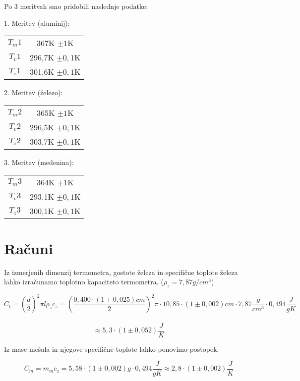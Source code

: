 \documentclass[a4paper]{article}
\begin{document}
Po 3 meritvah smo pridobili naslednje podatke:

1. Meritev (aluminij):
\begin{center}
\begin{tabular}{ |c|c| } 
 \hline
 $T_m1$ & 367K  $\pm{1}$K \\ 
 $T_v1$ & 296,7K $\pm{0,1}$K\\ 
 $T_z1$ & 301,6K $\pm{0,1}$K \\ 
 \hline
\end{tabular}
\end{center}

2. Meritev (železo):
\begin{center}
\begin{tabular}{ |c|c| } 
 \hline
 $T_m2$ & 365K  $\pm{1}$K \\ 
 $T_v2$ & 296,5K $\pm{0,1}$K\\ 
 $T_z2$ & 303,7K $\pm{0,1}$K \\ 
 \hline
\end{tabular}
\end{center}

3. Meritev (medenina):
\begin{center}
\begin{tabular}{ |c|c| } 
 \hline
 $T_m3$ & 364K  $\pm{1}$K \\ 
 $T_v3$ & 293.1K $\pm{0,1}$K\\ 
 $T_z3$ & 300,1K $\pm{0,1}$K \\ 
 \hline
\end{tabular}
\end{center}

\section{Računi}

Iz izmerjenih dimenzij termometra, gostote železa in specifične toplote železa lahko izračunamo toplotno kapaciteto termometra. ($\rho_z=7,87g/cm^3$)

\[C_t=\left(\frac{d}{2}\right)^2\pi l\rho_z c_z=\left(\frac{0,400\cdot(1\pm0,025)cm}{2}\right)^2\pi\cdot10,85 \cdot(1\pm0,002)cm\cdot 7,87\frac{g}{cm^3}\cdot 0,494 \frac{J}{gK}\] \\
\[\approx5,3 \cdot (1 \pm0,052)\frac{J}{K}\]

Iz mase mešala in njegove specifične toplote lahko ponovimo postopek:

\[C_m=m_m c_z=5,58\cdot(1\pm0,002)g\cdot0,494 \frac{J}{gK} \approx2,8\cdot(1\pm0,002)\frac{J}{K}\]
\end{document}
